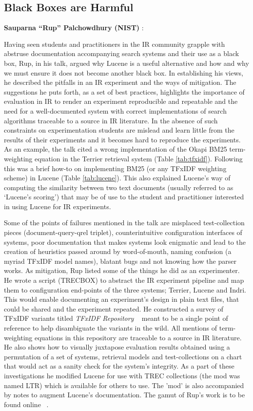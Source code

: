 \subsection*{Black Boxes are Harmful}
{\bf Sauparna ``Rup'' Palchowdhury (NIST) }:

Having seen students and practitioners in the IR community grapple
with abstruse documentation accompanying search systems and their use
as a black box, Rup, in his talk, argued why Lucene is a useful
alternative and how and why we must ensure it does not become another
black box. In establishing his views, he described the pitfalls in an
IR experiment and the ways of mitigation. The suggestions he puts
forth, as a set of best practices, highlights the importance of
evaluation in IR to render an experiment reproducible and repeatable
and the need for a well-documented system with correct implementations
of search algorithms traceable to a source in IR literature. In the
absence of such constraints on experimentation students are mislead
and learn little from the results of their experiments and it becomes
hard to reproduce the experiments. As an example, the talk cited a
wrong implementation of the Okapi BM25 term-weighting equation in the
Terrier retrieval system (Table \ref{tab:tfxidf}). Following this was
a brief how-to on implementing BM25 (or any TFxIDF weighting scheme)
in Lucene (Table \ref{tab:lucene}). This also explained Lucene's way
of computing the similarity between two text documents (usually
referred to as `Lucene's scoring') that may be of use to the student
and practitioner interested in using Lucene for IR experiments.

Some of the points of failures mentioned in the talk are misplaced
test-collection pieces (document-query-qrel triplet), counterintuitive
configuration interfaces of systems, poor documentation that makes
systems look enigmatic and lead to the creation of heuristics passed
around by word-of-mouth, naming confusion (a myriad TFxIDF model
names), blatant bugs and not knowing how the parser works. As
mitigation, Rup listed some of the things he did as an
experimenter. He wrote a script (TRECBOX) to abstract the IR
experiment pipeline and map them to configuration end-points of the
three systems; Terrier, Lucene and Indri. This would enable
documenting an experiment's design in plain text files, that could be
shared and the experiment repeated. He constructed a survey of TFxIDF
variants titled \emph{TFxIDF Repository} ~\cite{rup:TFXIDFRepository}
meant to be a single point of reference to help disambiguate the
variants in the wild. All mentions of term-weighting equations in this
repository are traceable to a source in IR literature. He also shows
how to visually juxtapose evaluation results obtained using a
permutation of a set of systems, retrieval models and test-collections
on a chart that would act as a sanity check for the system's
integrity. As a part of these investigations he modified Lucene for
use with TREC collections (the mod was named LTR) which is available
for others to use. The 'mod' is also accompanied by notes to augment
Lucene's documentation. The gamut of Rup's work is to be found online
~\cite{rup:IR}.

